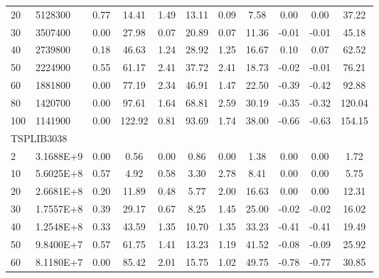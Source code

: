 {\begin{longtable}{@{}llccccccccc@{}}
20  & 5128300    & 0.77        & 14.41         & 1.49      & 13.11        & 0.09      & 7.58        & 0.00      & 0.00      & 37.22   \\
30  & 3507400    & 0.00        & 27.98         & 0.07      & 20.89        & 0.07      & 11.36       & -0.01     & -0.01     & 45.18   \\
40  & 2739800    & 0.18        & 46.63         & 1.24      & 28.92        & 1.25      & 16.67       & 0.10      & 0.07      & 62.52   \\
50  & 2224900    & 0.55        & 61.17         & 2.41      & 37.72        & 2.41      & 18.73       & -0.02     & -0.01     & 76.21   \\
60  & 1881800    & 0.00        & 77.19         & 2.34      & 46.91        & 1.47      & 22.50       & -0.39     & -0.42     & 92.88   \\
80  & 1420700    & 0.00        & 97.61         & 1.64      & 68.81        & 2.59      & 30.19       & -0.35     & -0.32     & 120.04  \\
100 & 1141900    & 0.00        & 122.92        & 0.81      & 93.69        & 1.74      & 38.00       & -0.66     & -0.63     & 154.15  \\
\multicolumn{11}{l}{TSPLIB3038}                                                                                                       \\
2   & 3.1688E+9  & 0.00        & 0.56          & 0.00      & 0.86         & 0.00      & 1.38        & 0.00      & 0.00      & 1.72    \\
10  & 5.6025E+8  & 0.57        & 4.92          & 0.58      & 3.30         & 2.78      & 8.41        & 0.00      & 0.00      & 5.75    \\
20  & 2.6681E+8  & 0.20        & 11.89         & 0.48      & 5.77         & 2.00      & 16.63       & 0.00      & 0.00      & 12.31   \\
30  & 1.7557E+8  & 0.39        & 29.17         & 0.67      & 8.25         & 1.45      & 25.00       & -0.02     & -0.02     & 16.02   \\
40  & 1.2548E+8  & 0.33        & 43.59         & 1.35      & 10.70        & 1.35      & 33.23       & -0.41     & -0.41     & 19.49   \\
50  & 9.8400E+7  & 0.57        & 61.75         & 1.41      & 13.23        & 1.19      & 41.52       & -0.08     & -0.09     & 25.92   \\
60  & 8.1180E+7  & 0.00        & 85.42         & 2.01      & 15.75        & 1.02      & 49.75       & -0.78     & -0.77     & 30.85   \\

\end{longtable}}
